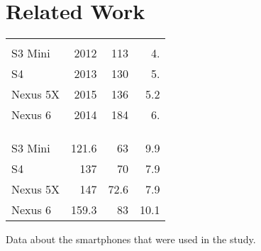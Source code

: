 \section{Related Work}
\label{sec:relw}
\begin{margintable}
	\vspace{-0.9cm}
	\centering
	\begin{tabularx}{1.03\marginparwidth}{Xd{2.1}d{2.1}d{1.1}}
		\toprule
		&
		&    
		 &
		 \\
		\\
		\\
		\midrule
		S3 Mini  		& 2012 & 113 &  4. \\
		S4 				& 2013 & 130 &5.   \\
		Nexus 5X 		& 2015 & 136 &5.2  \\
		Nexus 6 		& 2014 & 184 & 6.  \\ 
		
		
		\bottomrule
		
		& &
		 &
		 \\ 
		\\
		\\
		\midrule
		S3 Mini  		& 121.6 & 63  & 9.9 \\
		S4 				& 137  & 70  & 7.9 \\
		Nexus 5X 		& 147  & 72.6 & 7.9 \\
		Nexus 6 		& 159.3 & 83  & 10.1 \\
		
		\bottomrule
	\end{tabularx}%
	\caption[Smartphone data]{\small Data about the smartphones that were used in the study.}
	\label{tab:devices}
\end{margintable}
